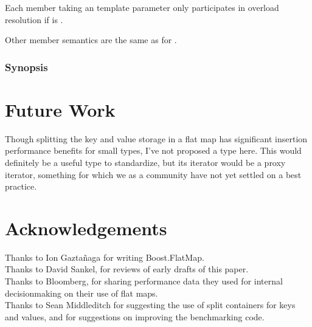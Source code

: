 Each member taking an  template parameter only participates in
overload resolution if  is
.

Other member semantics are the same as for .

\subsubsection{ Synopsis}




\section{Future Work}

Though splitting the key and value storage in a flat map has significant
insertion performance benefits for small types, I've not proposed a
 type here.  This would definitely be a useful type to
standardize, but its iterator would be a proxy iterator, something for which
we as a community have not yet settled on a best practice.


\section{Acknowledgements}

Thanks to Ion Gazta\~{n}aga for writing Boost.FlatMap.\\

Thanks to David Sankel, for reviews of early drafts of this paper.\\

Thanks to Bloomberg, for sharing performance data they used for internal
decisionmaking on their use of flat maps.\\

Thanks to Sean Middleditch for suggesting the use of split containers for keys
and values, and for suggestions on improving the benchmarking code.
